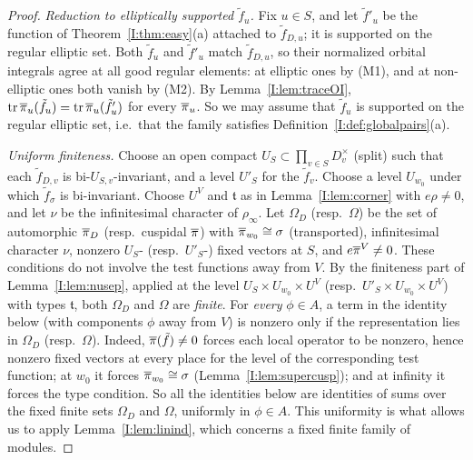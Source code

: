 \begin{proof}
\emph{Reduction to elliptically supported $\tilde f_u$.} Fix $u\in S$, and let $\tilde f'_u$ be the function of Theorem~\ref{I:thm:easy}(a) attached to $\tilde f_{D,u}$; it is supported on the regular elliptic set. Both $\tilde f_u$ and $\tilde f'_u$ match $\tilde f_{D,u}$, so their normalized orbital integrals agree at all good regular elements: at elliptic ones by (M1), and at non-elliptic ones both vanish by (M2). By Lemma~\ref{I:lem:traceOI}, $\operatorname{tr}\overline{\pi}_u(\tilde f_u)=\operatorname{tr}\overline{\pi}_u(\tilde f'_u)$ for every $\overline{\pi}_u$. So we may assume that $\tilde f_u$ is supported on the regular elliptic set, i.e.\ that the family satisfies Definition~\ref{I:def:globalpairs}(a).

\emph{Uniform finiteness.} Choose an open compact $U_S\subset\prod_{v\in S}D_v^\times$ (split) such that each $\tilde f_{D,v}$ is bi-$U_{S,v}$-invariant, and a level $U'_S$ for the $\tilde f_v$. Choose a level $U_{w_0}$ under which $\tilde f_\sigma$ is bi-invariant. Choose $U^V$ and $\mathfrak t$ as in Lemma~\ref{I:lem:corner} with $e\rho\neq0$, and let $\nu$ be the infinitesimal character of $\rho_\infty$. Let $\Omega_D$ (resp.\ $\Omega$) be the set of automorphic $\overline{\pi}_D$ (resp.\ cuspidal $\overline{\pi}$) with $\overline{\pi}_{w_0}\cong\sigma$ (transported), infinitesimal character $\nu$, nonzero $U_S$- (resp.\ $U'_S$-) fixed vectors at $S$, and $e\overline{\pi}^V\neq0$. These conditions do not involve the test functions away from $V$. By the finiteness part of Lemma~\ref{I:lem:nusep}, applied at the level $U_S\times U_{w_0}\times U^V$ (resp.\ $U'_S\times U_{w_0}\times U^V$) with types $\mathfrak t$, both $\Omega_D$ and $\Omega$ are \emph{finite}. For \emph{every} $\phi\in A$, a term in the identity below (with components $\phi$ away from $V$) is nonzero only if the representation lies in $\Omega_D$ (resp.\ $\Omega$). Indeed, $\overline{\pi}(\tilde f)\neq0$ forces each local operator to be nonzero, hence nonzero fixed vectors at every place for the level of the corresponding test function; at $w_0$ it forces $\overline{\pi}_{w_0}\cong\sigma$ (Lemma~\ref{I:lem:supercusp}); and at infinity it forces the type condition. So all the identities below are identities of sums over the fixed finite sets $\Omega_D$ and $\Omega$, uniformly in $\phi\in A$. This uniformity is what allows us to apply Lemma~\ref{I:lem:linind}, which concerns a fixed finite family of modules.


\end{proof}
